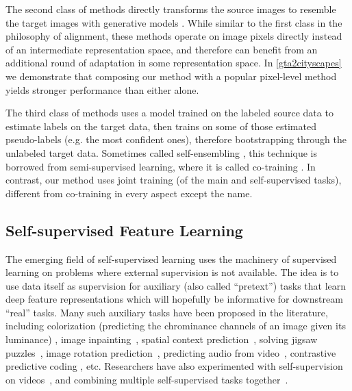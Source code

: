 \documentclass{article} \usepackage{iclr2020_conference,times}
\begin{document}
The second class of methods directly transforms the source images to resemble the target images with generative models
\citep{taigman2016unsupervised,hoffman2017cycada,bousmalis2017unsupervised}.
While similar to the first class in the philosophy of alignment, 
these methods operate on image pixels directly instead of an intermediate representation space, and therefore can benefit from an additional round of adaptation in some representation space.
In \autoref{gta2cityscapes} we demonstrate that composing our method with a popular pixel-level method yields stronger performance than either alone.

The third class of methods uses a model trained on the labeled source data to estimate labels on the target data, then trains on some of those estimated  pseudo-labels (e.g. the most confident ones), therefore bootstrapping through the unlabeled target data.
Sometimes called self-ensembling \citep{french2017self}, this technique is borrowed from semi-supervised learning, where it is called co-training \citep{saito2017asymmetric, zou2018unsupervised, chen2018adversarial, chen2011co}.
In contrast, our method uses joint training (of the main and self-supervised tasks), different from co-training in every aspect except the name.

\subsection{Self-supervised Feature Learning}
The emerging field of self-supervised learning uses the machinery of supervised learning on problems where external supervision is not available.
The idea is to use data itself as supervision for auxiliary (also called ``pretext'') tasks that learn deep feature representations which will hopefully be informative for downstream ``real'' tasks. 
Many such auxiliary tasks have been proposed in the literature, including colorization (predicting the chrominance channels of an image given its luminance) 
\citep{zhang2016colorful,larsson2017colorproxy,zhang2017split},
image inpainting~\cite{pathak2016context},
spatial context prediction~\citep{doersch2015unsupervised},
solving jigsaw puzzles~\citep{noroozi2016unsupervised}, 
image rotation prediction~\citep{gidaris2018unsupervised},
predicting audio from video~\citep{owens2016ambient},
contrastive predictive coding \citep{oord2018representation}, etc.
Researchers have also experimented with self-supervision on videos~\citep{Wang_UnsupICCV2015, CVPR2019_CycleTime}, and
combining multiple self-supervised tasks together~\citep{doersch2017multi}.
\end{document}
